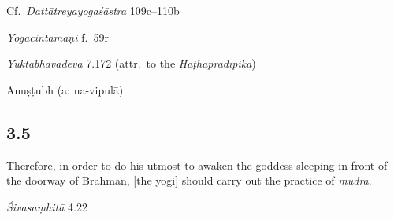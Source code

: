 \begin{ekdosis}
\begin{sources}[hp03_004]
Cf.~\emph{Dattātreyayogaśāstra} 109c–110b
\begin{versinnote}
\end{versinnote}
\end{sources}

\begin{testimonia}[hp03_004]
\emph{Yogacintāmaṇi} f.~59r
\begin{versinnote}
\end{versinnote}

\emph{Yuktabhavadeva} 7.172 (attr.~to the \emph{Haṭhapradīpikā})
\begin{versinnote}
\end{versinnote}
\end{testimonia}


\begin{metre}[hp03_004]
Anuṣṭubh (a: na-vipulā)
\end{metre}

\subsection*{3.5}
\begin{translation}[hp03_005]
Therefore, in order to do his utmost to awaken the goddess sleeping in front of the doorway of Brahman, [the yogi] should carry out the practice of \emph{mudrā}.
\end{translation}

\begin{sources}[hp03_005]
\emph{Śivasaṃhitā} 4.22
\begin{versinnote}
\end{versinnote}
\end{sources}


\end{ekdosis}
